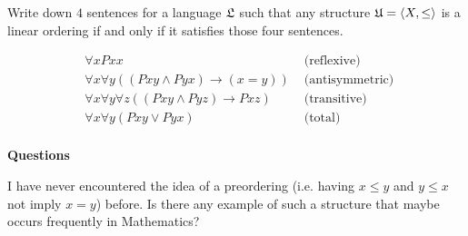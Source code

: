 \documentclass[english, 12pt]{amsart}
\begin{document}
\setlength{\headheight}{13.0pt}
\setlength{\footskip}{15.0pt}



\setcounter{problem}{6}
\begin{problem}
  Write down $4$ sentences for a language $\mathfrak{L}$ such that
  any structure $\mathfrak{U} = \langle X, \le \rangle$
  is a linear ordering if and only if it satisfies those four sentences.

  \begin{align*}
    &\forall x Pxx &\text{ (reflexive) }\\
    &\forall x \forall y \left( (Pxy \land Pyx) \to (x = y) \right) &\text{ (antisymmetric) }\\
    &\forall x \forall y \forall z \left( (Pxy \land Pyz) \to Pxz \right) &\text{ (transitive) } \\
    &\forall x \forall y \left( Pxy \lor Pyx \right) &\text{ (total) }\\
  \end{align*}
\end{problem}

\step
  \begin{center}\textbf{Questions} \end{center}

  \step
  I have never encountered the idea of a preordering
  (i.e. having $x \le y$ and $y \le x$ not imply $x = y$) before.
  Is there any example of such a structure that
  maybe occurs frequently in Mathematics?
\bigskip
\end{document}
